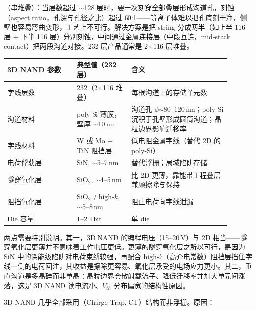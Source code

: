 （串堆叠）：当层数超过 $\sim$128 层时，要一次刻穿全部叠层形成沟道孔，刻蚀（aspect ratio，孔深与孔径之比）超过 60:1——等离子体难以把孔底刻干净，侧壁也容易弯曲变形，工艺上不可行。解决方案是把 string 分成两半（如上半 116 层 + 下半 116 层）分别刻蚀，中间通过金属连接层（中段互连，mid-stack contact）把两段沟道对接。232 层产品通常是 2$\times$116 层堆叠。

\begin{longtable}{L{0.28\linewidth}L{0.22\linewidth}L{0.4\linewidth}}
\toprule
3D NAND 参数 & 典型值（232 层） & 含义 \\
\midrule
字线层数 & 232（2$\times$116 堆叠） & 每根沟道上的存储单元数 \\
沟道材料 & poly-Si 薄膜，壁厚 $\sim$10\,nm & 沟道孔 $\phi$$\sim$80--120\,nm；poly-Si 沉积于孔壁形成圆筒沟道；晶粒边界影响迁移率 \\
字线材料 & W 或 Mo + TiN 阻挡层 & 低电阻金属字线（替代 2D 的 poly-Si） \\
电荷俘获层 & SiN, $\sim$5--7\,nm & 替代浮栅；局域陷阱存储 \\
隧穿氧化层 & SiO$_2$, $\sim$4--5\,nm & 比 2D 更薄，靠能带工程叠层兼顾擦除与保持 \\
阻挡氧化层 & SiO$_2$ / high-$k$, $\sim$5--8\,nm & 阻止电荷向字线泄漏 \\
Die 容量 & 1--2\,Tbit & 单 die \\
\bottomrule
\end{longtable}

两点需要特别说明。其一，3D NAND 的编程电压（15--20\,V）与 2D 相当——隧穿氧化层更薄并不意味着工作电压更低。更薄的隧穿氧化层之所以可行，是因为 SiN 中的深能级陷阱对电荷束缚较强，再配合 high-$k$（高介电常数）阻挡层挡住字线一侧的电荷回注，其收益是擦除更容易、氧化层承受的电场应力更小。其二，垂直沟道是多晶硅而非单晶：晶粒边界会散射载流子、降低迁移率并加大单元间涨落，这是 3D NAND 读电流小、$V_{th}$ 分布偏宽的结构性原因。


3D NAND 几乎全部采用（Charge Trap, CT）结构而非浮栅。原因：

